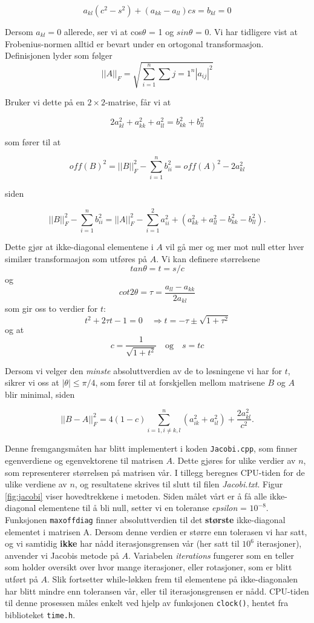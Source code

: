 \documentclass{article}
\begin{document}
\[a_{kl}(c^2 - s^2) + (a_{kk} - a_{ll})cs = b_{kl} = 0 \]

Dersom $a_{kl} = 0$ allerede, ser vi at cos$\theta$ = 1 og $sin\theta$ = 0. Vi har tidligere vist at Frobenius-normen alltid er bevart under en ortogonal transformasjon. Definisjonen lyder som følger
\begin{equation}
|| A ||_F = \sqrt{\sum_{i=1}^n \sum{j=1}^n |a_{ij}|^2 }
\end{equation}

Bruker vi dette på en $2\times 2$-matrise, får vi at 

\[2a_{kl}^2 + a_{kk}^2 + a_{ll}^2 = b_{kk}^2 + b_{ll}^2 \]

som fører til at

\[off(B)^2 = || B ||_F^2 - \sum_{i=1}^n b_{ii}^2 = off(A)^2 - 2a_{kl}^2 \]

siden

\[ || B ||_F^2 - \sum_{i=1}^n b_{ii}^2 = || A ||_F^2 - \sum_{i=1}^2a_{ii}^2 + (a_{kk}^2 + a_{ll}^2 - b_{kk}^2 - b_{ll}^2).  \]

Dette gjør at ikke-diagonal elementene i $A$ vil gå mer og mer mot null etter hver similær transformasjon som utføres på $A$. Vi kan definere størrelsene 
\[tan\theta = t = s/c \]
og
\[cot2\theta = \tau = \frac{a_{ll} - a_{kk}}{2a_{kl}} \]
som gir oss to verdier for $t$:
\[t^2 + 2\tau t - 1 = 0 \quad \Rightarrow t = -\tau \pm \sqrt{1 + \tau^2}  \]
og at
\[ c = \frac{1}{\sqrt{1 + t^2}} \quad \textrm{og} \quad s = tc \]

Dersom vi velger den \textit{minste} absoluttverdien av de to løsningene vi har for $t$, sikrer vi oss at $| \theta | \le \pi /4$, som fører til at forskjellen mellom matrisene $B$ og $A$ blir minimal, siden

\[||B - A||_F^2 = 4(1-c) \sum_{i=1, i\neq k,l}^n (a_{ik}^2 + a_{il}^2) + \frac{2a_{kl}^2}{c^2}. \]

Denne fremgangsmåten har blitt implementert i koden \texttt{Jacobi.cpp}, som finner egenverdiene og egenvektorene til matrisen $A$. Dette gjøres for ulike verdier av $n$, som representerer størrelsen på matrisen vår. I tillegg beregnes CPU-tiden for de ulike verdiene av $n$, og resultatene skrives til slutt til filen \textit{Jacobi.txt}. Figur \ref{fig:jacobi} viser hovedtrekkene i metoden. Siden målet vårt er å få alle ikke-diagonal elementene til å bli null, setter vi en toleranse \textit{epsilon} = $10^{-8}$. Funksjonen \texttt{maxoffdiag} finner absoluttverdien til det \textbf{største} ikke-diagonal elementet i matrisen A. Dersom denne verdien er større enn tolerasen vi har satt, og vi samtidig \textbf{ikke} har nådd iterasjonsgrensen vår (her satt til $10^6$ iterasjoner), anvender vi Jacobis metode på $A$. Variabelen \textit{iterations} fungerer som en teller som holder oversikt over hvor mange iterasjoner, eller rotasjoner, som er blitt utført på $A$. Slik fortsetter while-løkken frem til elementene på ikke-diagonalen har blitt mindre enn toleransen vår, eller til iterasjonsgrensen er nådd. CPU-tiden til denne prosessen måles enkelt ved hjelp av funksjonen \texttt{clock()}, hentet fra biblioteket \texttt{time.h}.
\end{document}
